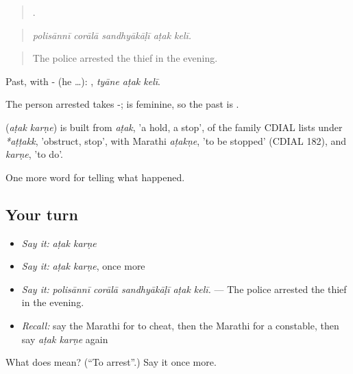 \begin{quote}
    .
\end{quote}

\begin{quote}
\emph{polisānnī corālā sandhyākāḷī aṭak kelī.}
\end{quote}

\begin{quote}
The police arrested the thief in the evening.
\end{quote}

Past, with - (he …):   , \emph{tyāne aṭak kelī}.

The person arrested takes -;  is feminine, so the past is  .

\begin{cousinweb}
\textbf{ } (\emph{aṭak karṇe}) is built from \emph{aṭak}, 'a hold, a stop', of the family CDIAL lists under \emph{*aṭṭakk}, 'obstruct, stop', with Marathi \emph{aṭakṇe}, 'to be stopped' (CDIAL 182), and \emph{karṇe}, 'to do'.
\end{cousinweb}

\begin{grammarlens}[title={What you've built}]
One more word for telling what happened.
\end{grammarlens}

\subsection*{Your turn}
\begin{itemize}
\raggedright
  \item \emph{Say it:} \emph{aṭak karṇe}
  \item \emph{Say it:} \emph{aṭak karṇe}, once more
  \item \emph{Say it:} \emph{polisānnī corālā sandhyākāḷī aṭak kelī.} — The police arrested the thief in the evening.
  \item \emph{Recall:} say the Marathi for to cheat, then the Marathi for a constable, then say \emph{aṭak karṇe} again
\end{itemize}

\begin{tcolorbox}[breakable,colback=teal!4,colframe=teal!35!black,title={Before you move on}]
What does   mean? (\textquotedblleft{}To arrest\textquotedblright{}.) Say it once more.
\end{tcolorbox}
